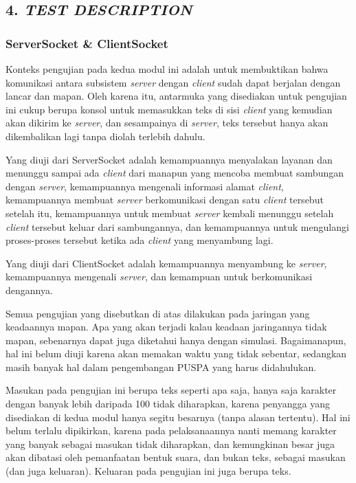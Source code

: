 \subsection*{\textcolor{subsectioncolor}{\textsf{4. \textit{TEST DESCRIPTION}}}}


\subsubsection*{ServerSocket \& ClientSocket}

Konteks pengujian pada kedua modul ini adalah untuk membuktikan bahwa komunikasi antara subsistem \textit{server} dengan \textit{client} sudah dapat berjalan dengan lancar dan mapan.
Oleh karena itu,
antarmuka yang disediakan untuk pengujian ini cukup berupa konsol untuk memasukkan teks di sisi \textit{client} yang kemudian akan dikirim ke \textit{server},
dan sesampainya di \textit{server},
teks tersebut hanya akan dikembalikan lagi tanpa diolah terlebih dahulu.

Yang diuji dari ServerSocket adalah kemampuannya menyalakan layanan dan menunggu sampai ada \textit{client} dari manapun yang mencoba membuat sambungan dengan \textit{server},
kemampuannya mengenali informasi alamat \textit{client},
kemampuannya membuat \textit{server} berkomunikasi dengan satu \textit{client} tersebut setelah itu,
kemampuannya untuk membuat \textit{server} kembali menunggu setelah \textit{client} tersebut keluar dari sambungannya,
dan kemampuannya untuk mengulangi proses-proses tersebut ketika ada \textit{client} yang menyambung lagi.

Yang diuji dari ClientSocket adalah kemampuannya menyambung ke \textit{server},
kemampuannya mengenali \textit{server},
dan kemampuan untuk berkomunikasi dengannya.

Semua pengujian yang disebutkan di atas dilakukan pada jaringan yang keadaannya mapan.
Apa yang akan terjadi kalau keadaan jaringannya tidak mapan,
sebenarnya dapat juga diketahui hanya dengan simulasi.
Bagaimanapun, hal ini belum diuji karena akan memakan waktu yang tidak sebentar,
sedangkan masih banyak hal dalam pengembangan PUSPA yang harus didahulukan.

Masukan pada pengujian ini berupa teks seperti apa saja,
hanya saja karakter dengan banyak lebih daripada 100 tidak diharapkan,
karena penyangga yang disediakan di kedua modul hanya segitu besarnya (tanpa alasan tertentu).
Hal ini belum terlalu dipikirkan,
karena pada pelaksanaannya nanti memang karakter yang banyak sebagai masukan tidak diharapkan,
dan kemungkinan besar juga akan dibatasi oleh pemanfaatan bentuk suara, dan bukan teks, sebagai masukan (dan juga keluaran).
Keluaran pada pengujian ini juga berupa teks.

